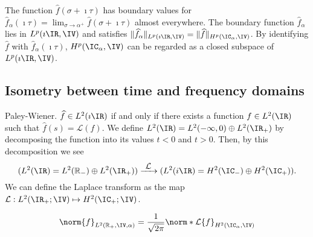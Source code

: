 \begin{proposition} \label{prop:hardy-plane-limit2}
    The function $\widehat{f}(\sigma+\imath \tau)$ has boundary values for $\widehat{f}_{\alpha}(\imath \tau) = \lim_{\sigma\rightarrow \alpha^{+}} \widehat{f}(\sigma+\imath \tau)$ almost everywhere. The boundary function $\widehat{f}_{\alpha}$ lies in $L^p(\imath\IR,\IV)$ and satisfies $\lVert \widehat{f}_{\alpha} \rVert_{L^{p}(\imath\IR,\IV)} = \lVert \widehat{f} \rVert_{H^{p}(\IC_\alpha,\IV)}$. By identifying $\widehat{f}$ with $\widehat{f}_{\alpha}(\imath \tau)$, $H^p(\IC_\alpha,\IV)$ can be regarded as a closed subspace of $L^p(\imath\IR,\IV)$. %
\end{proposition}


\subsection{Isometry between time and frequency domains}

\begin{theorem} {Paley-Wiener.} \label{th:PW}
    $\widehat{f} \in L^2(\imath\IR)$ if and only if there exists a function $f \in L^2(\IR)$ such that $\widehat{f}(s) = \mathcal{L}(f)$.
    We define $L^2(\IR)=L^2(-\infty,0)\oplus L^2(\IR_+)$ by decomposing the function into its values $t<0$ and $t>0$. Then, by this decomposition we see
    \begin{equation}
       (L^2(\IR)=L^2(\mathbb{R}_-)\oplus L^2(\IR_+)) \xrightarrow{\makebox[0.5cm]{$\mathcal{L}$}} (L^2(i\IR)=H^2(\IC_-)\oplus H^2(\IC_+)). 
    \end{equation}
    We can define the Laplace transform as the map $\mathcal{L}:L^2(\IR_+;\IV) \mapsto H^2(\IC_+;\IV)$.
\end{theorem}

\begin{corollary}\label{cor:paley_wiener_alpha}
\begin{equation}
	\norm{f}_{L^2(\mathbb{R}_+,\IV,\alpha)} = \frac{1}{\sqrt{2\pi}} \norm*{\mathcal{L}\{f\}}_{H^2(\IC_\alpha,\IV)}
\end{equation}
\end{corollary}

